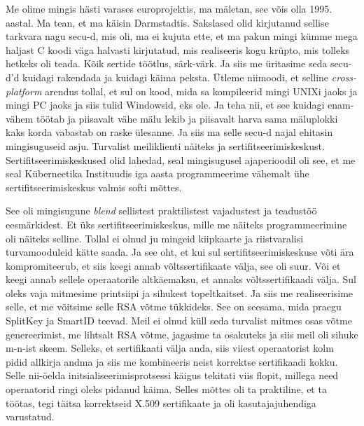 Me olime mingis hästi varases europrojektis, ma mäletan, see võis olla 1995. 
aastal. Ma tean, et ma käisin Darmstadtis. Sakslased olid 
kirjutanud sellise tarkvara nagu secu-d, mis oli,  ma ei kujuta ette, et ma 
pakun mingi kümme mega haljast C koodi väga halvasti kirjutatud, mis  
realiseeris kogu krüpto, mis tolleks hetkeks oli teada. Kõik sertide töötlus, 
särk-värk. Ja siis me üritasime seda secu-d'd kuidagi rakendada ja kuidagi 
käima peksta. Ütleme niimoodi, et selline \emph{cross-platform} arendus tollal, 
et sul on kood, mida sa kompileerid mingi UNIXi jaoks ja mingi PC jaoks ja siis 
tulid Windowsid, eks ole. Ja teha nii, et see kuidagi enam-vähem  töötab ja 
piisavalt vähe mälu lekib ja piisavalt harva sama mäluplokki kaks korda 
vabastab on  raske ülesanne. Ja siis ma selle secu-d najal ehitasin 
mingisuguseid asju. Turvalist meiliklienti näiteks ja sertifitseerimiskeskust. 
Sertifitseerimiskeskused olid lahedad,  seal mingisugusel  ajaperioodil oli 
see, et me seal Küberneetika Instituudis iga aasta programmeerime vähemalt ühe 
sertifitseerimiskeskus valmis softi mõttes.


See oli mingisugune \emph{blend} sellistest praktilistest vajadustest ja 
teadustöö eesmärkidest. Et üks  sertifitseerimiskeskus, mille me näiteks 
programmeerimine oli näiteks selline. Tollal ei olnud ju mingeid kiipkaarte ja 
riistvaralisi turvamooduleid kätte saada. Ja see oht, et kui sul 
sertifitseerimiskeskuse võti ära 
 kompromiteerub, et siis keegi annab võltssertifikaate välja, see oli suur. Või 
et keegi annab sellele operaatorile altkäemaksu, et annaks võltssertifikaadi 
välja. Sul oleks vaja mitmesime printsiipi ja sihukest  topeltkaitset. Ja siis 
me realiseerisime selle, et me võitsime selle RSA võtme tükkideks. See on 
seesama, mida praegu SplitKey ja SmartID teevad. 
Meil ei olnud küll seda turvalist mitmes osas võtme genereerimist, me lihtsalt 
RSA võtme, jagasime ta osakuteks ja siis meil oli sihuke m-n-ist skeem. 
Selleks, et sertifikaati välja anda, siis viiest operaatorist kolm pidid  
allkirja andma ja siis me kombineeris neist korrektse sertifikaadi kokku. Selle 
nii-öelda initsialiseerimisprotsessi käigus tekitati viis flopit,  millega need 
 operaatorid ringi oleks pidanud käima. Selles mõttes oli ta praktiline, et ta 
töötas,  tegi täitsa korrektseid X.509  sertifikaate ja oli kasutajajuhendiga 
varustatud.  
 

